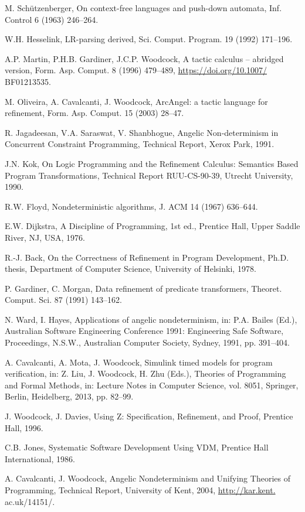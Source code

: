 \documentclass[11pt]{article}
\begin{document}
\begin{enumerate}[label={[\arabic*]}, leftmargin=*, itemsep=0.4em]
\item M. Schützenberger, On context-free languages and push-down automata, Inf. Control 6 (1963) 246–264.
\item W.H. Hesselink, LR-parsing derived, Sci. Comput. Program. 19 (1992) 171–196.
\item A.P. Martin, P.H.B. Gardiner, J.C.P. Woodcock, A tactic calculus – abridged version, Form. Asp. Comput. 8 (1996) 479–489, \url{https://doi.org/10.1007/} BF01213535.
\item M. Oliveira, A. Cavalcanti, J. Woodcock, ArcAngel: a tactic language for refinement, Form. Asp. Comput. 15 (2003) 28–47.
\item R. Jagadeesan, V.A. Saraswat, V. Shanbhogue, Angelic Non-determinism in Concurrent Constraint Programming, Technical Report, Xerox Park, 1991.
\item J.N. Kok, On Logic Programming and the Refinement Calculus: Semantics Based Program Transformations, Technical Report RUU-CS-90-39, Utrecht University, 1990.
\item R.W. Floyd, Nondeterministic algorithms, J. ACM 14 (1967) 636–644.
\item E.W. Dijkstra, A Discipline of Programming, 1st ed., Prentice Hall, Upper Saddle River, NJ, USA, 1976.
\item R.-J. Back, On the Correctness of Refinement in Program Development, Ph.D. thesis, Department of Computer Science, University of Helsinki, 1978.
\item P. Gardiner, C. Morgan, Data refinement of predicate transformers, Theoret. Comput. Sci. 87 (1991) 143–162.
\item N. Ward, I. Hayes, Applications of angelic nondeterminism, in: P.A. Bailes (Ed.), Australian Software Engineering Conference 1991: Engineering Safe Software, Proceedings, N.S.W., Australian Computer Society, Sydney, 1991, pp. 391–404.
\item A. Cavalcanti, A. Mota, J. Woodcock, Simulink timed models for program verification, in: Z. Liu, J. Woodcock, H. Zhu (Eds.), Theories of Programming and Formal Methods, in: Lecture Notes in Computer Science, vol. 8051, Springer, Berlin, Heidelberg, 2013, pp. 82–99.
\item J. Woodcock, J. Davies, Using Z: Specification, Refinement, and Proof, Prentice Hall, 1996.
\item C.B. Jones, Systematic Software Development Using VDM, Prentice Hall International, 1986.
\item A. Cavalcanti, J. Woodcock, Angelic Nondeterminism and Unifying Theories of Programming, Technical Report, University of Kent, 2004, \url{http://kar.kent.} ac.uk/14151/.

\end{enumerate}
\end{document}
